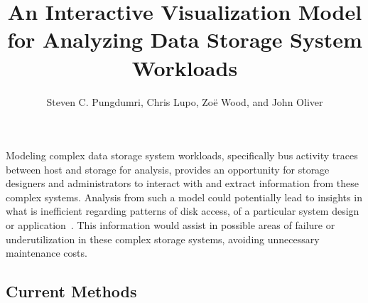 \documentclass[journal]{vgtc}                %
\title{An Interactive Visualization Model for Analyzing Data Storage System Workloads}
\author{Steven C. Pungdumri, Chris Lupo, Zo\"{e} Wood, and John Oliver}
\begin{document}


\maketitle


Modeling complex data storage system workloads, specifically bus activity traces between host and storage for analysis, provides an opportunity for storage designers and administrators to interact with and extract information from these complex systems. Analysis from such a model could potentially lead to insights in what is inefficient regarding patterns of disk access, of a particular system design or application~\cite{internal:understanding}. This information would assist in possible areas of failure or underutilization in these complex storage systems, avoiding unnecessary maintenance costs.

\subsection{Current Methods}
\label{current_methods}
\end{document}
